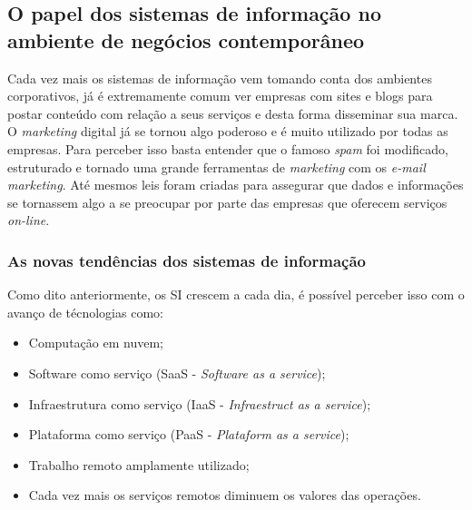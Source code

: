 \documentclass[
	12pt,				%
	openany,			%
	a4paper,			%
	chapter=TITLE,		%
	section=TITLE,		%
	english,
	brazil				%
]{abntex2}
\begin{document}
\begin{itemize}
\subsection{O papel dos sistemas de informação no ambiente de negócios contemporâneo}

Cada vez mais os sistemas de informação vem tomando conta dos ambientes corporativos, já é extremamente comum ver empresas com sites e blogs para postar conteúdo com relação a seus serviços e desta forma disseminar sua marca. O \textit{marketing} digital já se tornou algo poderoso e é muito utilizado por todas as empresas. Para perceber isso basta entender que o famoso \textit{spam} foi modificado, estruturado e tornado uma grande ferramentas de \textit{marketing} com os \textit{e-mail marketing}. Até mesmos leis foram criadas para assegurar que dados e informações se tornassem algo a se preocupar por parte das empresas que oferecem serviços \textit{on-line}.

\subsubsection{As novas tendências dos sistemas de informação}


Como dito anteriormente, os SI crescem a cada dia, é possível perceber isso com o avanço de técnologias como:
	\begin{itemize}
		\item Computação em nuvem;
		\item Software como serviço (SaaS - \textit{Software as a service});
		\item Infraestrutura como serviço (IaaS - \textit{Infraestruct as a service});
		\item Plataforma como serviço (PaaS - \textit{Plataform as a service});
		\item Trabalho remoto amplamente utilizado;
		\item Cada vez mais os serviços remotos diminuem os valores das operações.
	\end{itemize}


\end{itemize}
\end{document}
